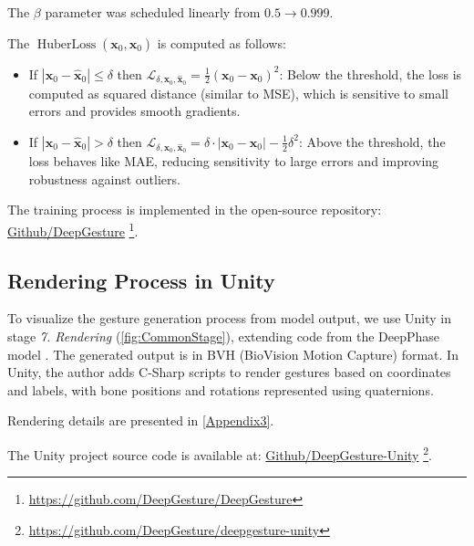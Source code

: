The $\beta$ parameter was scheduled linearly from $0.5 \rightarrow 0.999$.

The $\operatorname{HuberLoss} (\mathbf{x}_{0},  \hat{\mathbf{x}}_{0} )$ is computed as follows:

\begin{itemize}
	\item If $|\mathbf{x}_0 - \hat{\mathbf{x}}_0| \leq \delta$ then $\mathcal{L}_{ \delta, \mathbf{x}_0, \hat{\mathbf{x}}_0} = \frac{1}{2} (\mathbf{x}_0 - \mathbf{x}_0)^2$: Below the threshold, the loss is computed as squared distance (similar to MSE), which is sensitive to small errors and provides smooth gradients.
	
	\item If $|\mathbf{x}_0 - \hat{\mathbf{x}}_0| > \delta$ then $\mathcal{L}_{ \delta, \mathbf{x}_0, \hat{\mathbf{x}}_0}  =  \delta \cdot |\mathbf{x}_0 - \mathbf{x}_0| - \frac{1}{2} \delta^2$: Above the threshold, the loss behaves like MAE, reducing sensitivity to large errors and improving robustness against outliers.
	
\end{itemize}

The training process is implemented in the open-source repository: \hyperlink{https://github.com/DeepGesture/DeepGesture}{Github/DeepGesture} \footnote{\url{https://github.com/DeepGesture/DeepGesture}}.

\subsection{Rendering Process in Unity}
\label{sec:Render}

To visualize the gesture generation process from model output, we use Unity in stage \textit{7. Rendering} (\autoref{fig:CommonStage}), extending code from the DeepPhase model \cite{starke2022deepphase}. The generated output is in BVH (BioVision Motion Capture) format. In Unity, the author adds C-Sharp scripts to render gestures based on coordinates and labels, with bone positions and rotations represented using quaternions.

Rendering details are presented in \autoref{Appendix3}.

The Unity project source code is available at: \hyperlink{https://github.com/DeepGesture/deepgesture-unity}{Github/DeepGesture-Unity}
\footnote{\url{https://github.com/DeepGesture/deepgesture-unity}}.










